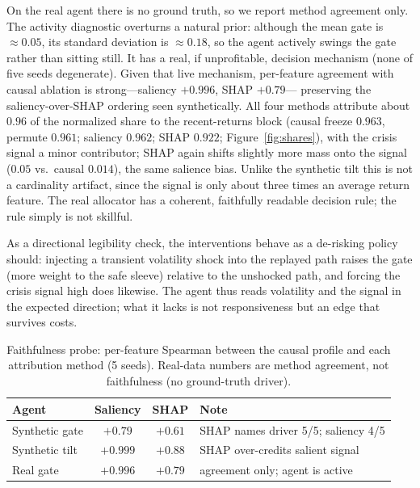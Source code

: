 \documentclass[sigconf,anonymous,review]{acmart}
\begin{document}
On the real agent there is no ground truth, so we report method agreement only. The
activity diagnostic overturns a natural prior: although the mean gate is
$\approx0.05$, its standard deviation is $\approx0.18$, so the agent actively swings
the gate rather than sitting still. It has a real, if unprofitable, decision
mechanism (none of five seeds degenerate). Given that live mechanism, per-feature
agreement with causal ablation is strong---saliency $+0.996$, SHAP $+0.79$---
preserving the saliency-over-SHAP ordering seen synthetically. All four methods
attribute about $0.96$ of the normalized share to the recent-returns block (causal
freeze $0.963$, permute $0.961$; saliency $0.962$; SHAP $0.922$; Figure~\ref{fig:shares}), with the crisis
signal a minor contributor; SHAP again shifts slightly more mass onto the signal
($0.05$ vs.\ causal $0.014$), the same salience bias. Unlike the synthetic tilt this
is not a cardinality artifact, since the signal is only about three times an average
return feature. The real allocator has a coherent, faithfully readable decision rule;
the rule simply is not skillful.

As a directional legibility check, the interventions behave as a de-risking policy
should: injecting a transient volatility shock into the replayed path raises the gate
(more weight to the safe sleeve) relative to the unshocked path, and forcing the
crisis signal high does likewise. The agent thus reads volatility and the signal in
the expected direction; what it lacks is not responsiveness but an edge that survives
costs.

\begin{table}[t]
  \caption{Faithfulness probe: per-feature Spearman between the causal profile and
  each attribution method (5 seeds). Real-data numbers are method agreement, not
  faithfulness (no ground-truth driver).}
  \label{tab:rq3}
  \small
  \begin{tabular}{lccl}
    \toprule
    Agent & Saliency & SHAP & Note\\
    \midrule
    Synthetic gate & $+0.79$ & $+0.61$ & SHAP names driver 5/5; saliency 4/5\\
    Synthetic tilt & $+0.999$ & $+0.88$ & SHAP over-credits salient signal\\
    Real gate      & $+0.996$ & $+0.79$ & agreement only; agent is active\\
    \bottomrule
  \end{tabular}
\end{table}
\end{document}
